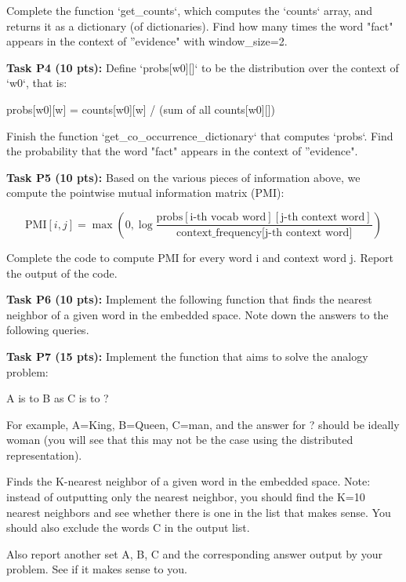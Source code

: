 \documentclass[12pt]{article}
\begin{document}
Complete the function `get\_counts`, which computes the `counts` array, and returns it as a dictionary (of dictionaries). Find how many times the word "fact" appears in the context of ”evidence" with window\_size=2.

\textbf{Task P4 (10 pts):} Define `probs[w0][]` to be the distribution over the context of `w0`, that is:

probs[w0][w] = counts[w0][w] / (sum of all counts[w0][])

Finish the function `get\_co\_occurrence\_dictionary` that computes `probs`. Find the probability that the word "fact" appears in the context of ”evidence".

\textbf{Task P5 (10 pts):} Based on the various pieces of information above, we compute the pointwise mutual information matrix (PMI):

\begin{equation*}
    \text{PMI}[i,j] = \max\left(0, \log \frac{\text{probs}[\text{i-th vocab word}][\text{j-th context word}]}{ \text{context\_frequency[j-th context word]}}\right)
\end{equation*}

Complete the code to compute PMI for every word i and context word j. Report the output of the code.

\textbf{Task P6 (10 pts):} Implement the following function that finds the nearest neighbor of a given word in the embedded space. Note down the answers to the following queries. 


\textbf{Task P7 (15 pts):} Implement the function that aims to solve the analogy problem:

A is to B as C is to ?

For example, A=King, B=Queen, C=man, and the answer for ? should be ideally woman (you will see that this may not be the case using the distributed representation).

Finds the K-nearest neighbor of a given word in the embedded space. Note: instead of outputting only the nearest neighbor, you should find the K=10 nearest neighbors and see whether there is one in the list that makes sense. You should also exclude the words C in the output list.

Also report another set A, B, C and the corresponding answer output by your problem. See if it makes sense to you.
\end{document}
